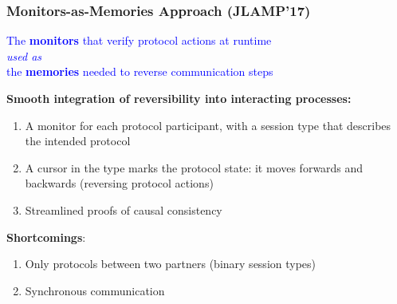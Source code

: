\documentclass[12pt]{beamer}
\begin{document}
\begin{frame}
\frametitle{Monitors-as-Memories Approach (JLAMP'17)}

\begin{tcolorbox}[colback=blue!5,%
                  colframe=blue,%
                  width=12.1cm,%
                  arc=2mm, auto outer arc,
                 ]
\begin{center}
\textcolor{blue}{The \textbf{monitors} that verify protocol actions at runtime \\ \emph{used as} \\ the \textbf{memories} needed to reverse communication steps}
\end{center}
\end{tcolorbox}

\bigskip
\textbf{Smooth integration of reversibility into interacting processes:}
	\begin{enumerate}[+]
	\item A monitor for each protocol participant, with a session type that describes the intended protocol
	\item A cursor in the type marks the protocol state: it moves forwards and backwards (reversing protocol actions)
	\item Streamlined proofs of causal consistency
	\end{enumerate}
	
\bigskip

\textbf{Shortcomings}:
	\begin{enumerate}[-]
	\item Only protocols between two partners (binary session types)
	\item Synchronous communication
	\end{enumerate}
\end{frame}

\end{document}
